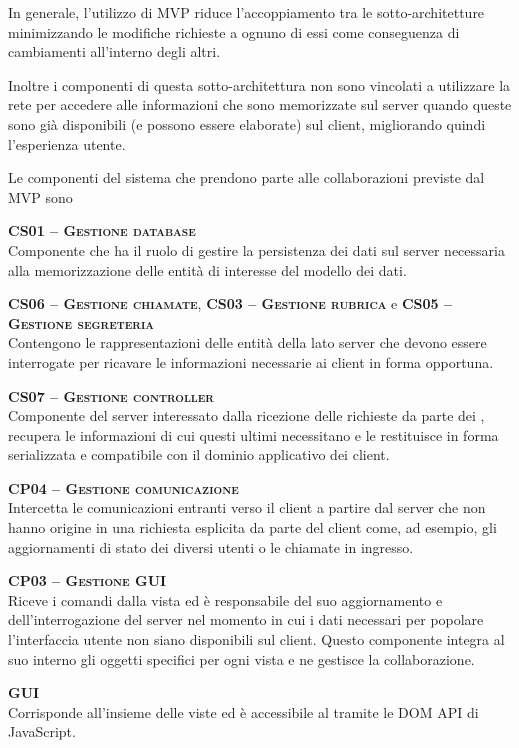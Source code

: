In generale, l'utilizzo di MVP riduce l'accoppiamento tra le sotto-architetture minimizzando le modifiche richieste a ognuno di essi come conseguenza di cambiamenti all'interno degli altri.

Inoltre i componenti di questa sotto-architettura non sono vincolati a utilizzare la rete per accedere alle informazioni che sono memorizzate sul server quando queste sono già disponibili (e possono essere elaborate) sul client, migliorando quindi l'esperienza utente.

Le componenti del sistema che prendono parte alle collaborazioni previste dal  MVP sono
\begin{description}
  \item{\scshape\bfseries CS01 -- Gestione database}\\
Componente che ha il ruolo di gestire la persistenza dei dati sul server necessaria alla memorizzazione delle entità di interesse del modello dei dati.

  \item{\textsc{\bfseries CS06 -- Gestione chiamate}, \textsc{\bfseries CS03 -- Gestione rubrica} e \textsc{\bfseries CS05 -- Gestione segreteria}}\\
Contengono le rappresentazioni delle entità della  lato server che devono essere interrogate per ricavare le informazioni necessarie ai client in forma opportuna.

  \item{\scshape\bfseries CS07 -- Gestione controller}\\
Componente del server interessato dalla ricezione delle richieste da parte dei , recupera le informazioni di cui questi ultimi necessitano e le restituisce in forma serializzata e compatibile con il dominio applicativo dei client.

  \item{\scshape\bfseries CP04 -- Gestione comunicazione}\\
Intercetta le comunicazioni entranti verso il client a partire dal server che non hanno origine in una richiesta esplicita da parte del client come, ad esempio, gli aggiornamenti di stato dei diversi utenti o le chiamate in ingresso.
  
  \item{\scshape\bfseries CP03 -- Gestione GUI}\\
Riceve i comandi dalla vista ed è responsabile del suo aggiornamento e dell'interrogazione del server nel momento in cui i dati necessari per popolare l'interfaccia utente non siano disponibili sul client. Questo componente integra al suo interno gli oggetti  specifici per ogni vista e ne gestisce la collaborazione.

  \item{\scshape\bfseries GUI}\\
Corrisponde all'insieme delle viste ed è accessibile al  tramite le DOM API di JavaScript.
\end{description}

